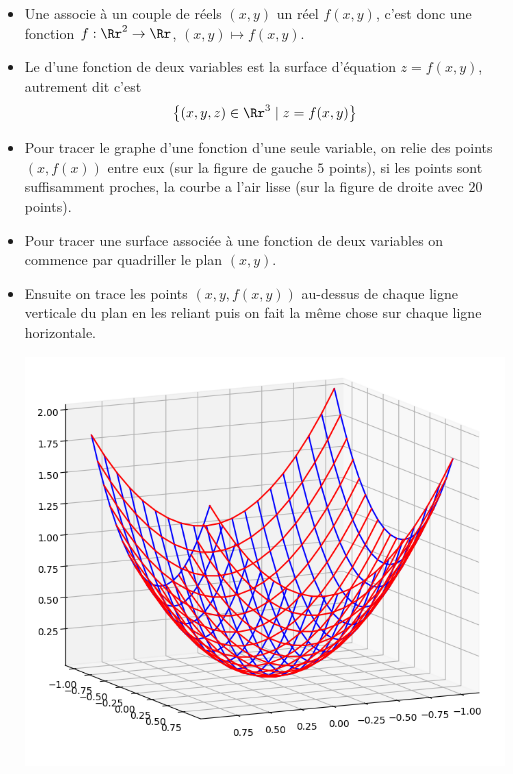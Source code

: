 \documentclass[11pt,class=report,crop=false]{standalone}
\begin{document}
\begin{cours}[Surface d'équation $z=f(x,y)$]
\sauteligne
\begin{itemize}
	\item Une  associe à un couple de réels $(x,y)$ un réel $f(x,y)$, c'est donc une fonction $f : \Rr^2 \to \Rr$, $(x,y) \mapsto f(x,y)$.
	
	\item Le  d'une fonction de deux variables est la surface d'équation $z=f(x,y)$, autrement dit 
	c'est 
	$$\big\{ (x,y,z) \in \Rr^3 \mid z = f(x,y) \big\}$$
	
	\item Pour tracer le graphe d'une fonction d'une seule variable, on relie des points $(x,f(x))$ entre eux (sur la figure de gauche $5$ points), si les points sont suffisamment proches, la courbe a l'air lisse (sur la figure de droite avec $20$ points).

	
	\item Pour tracer une surface associée à une fonction de deux variables on commence par quadriller le plan $(x,y)$.
	
	
	\item Ensuite on trace les points $(x,y,f(x,y))$ au-dessus de chaque ligne verticale du plan en les reliant puis on fait la même chose sur chaque ligne horizontale.

\begin{center}
	\includegraphics[scale=\myscale,scale=0.3]{ecran-surface-1}
\end{center}	
\end{itemize}	
	
\end{cours}
\end{document}
